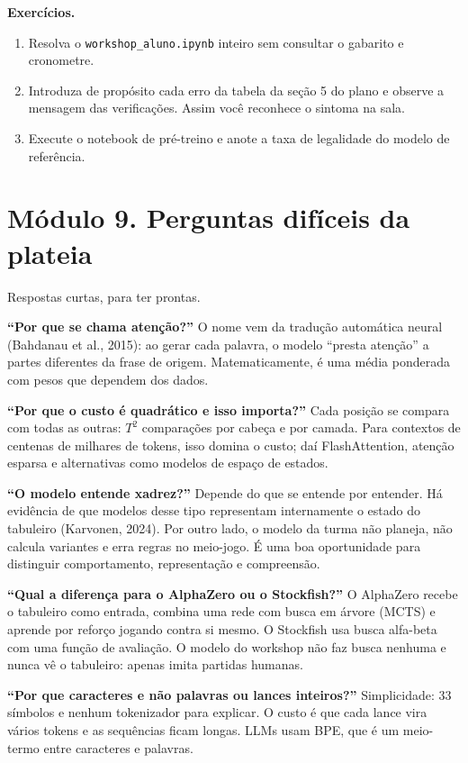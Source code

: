 \documentclass[
  11pt,
]{article}
\providecommand{\tightlist}{%
  \setlength{\itemsep}{0pt}\setlength{\parskip}{0pt}}
\begin{document}
\textbf{Exercícios.}

\begin{enumerate}
\def\labelenumi{\arabic{enumi}.}
\tightlist
\item
  Resolva o \texttt{workshop\_aluno.ipynb} inteiro sem consultar o
  gabarito e cronometre.
\item
  Introduza de propósito cada erro da tabela da seção 5 do plano e
  observe a mensagem das verificações. Assim você reconhece o sintoma na
  sala.
\item
  Execute o notebook de pré-treino e anote a taxa de legalidade do
  modelo de referência.
\end{enumerate}

\section{Módulo 9. Perguntas difíceis da
plateia}\label{muxf3dulo-9.-perguntas-difuxedceis-da-plateia}

Respostas curtas, para ter prontas.

\textbf{``Por que se chama atenção?''} O nome vem da tradução automática
neural (Bahdanau et al., 2015): ao gerar cada palavra, o modelo ``presta
atenção'' a partes diferentes da frase de origem. Matematicamente, é uma
média ponderada com pesos que dependem dos dados.

\textbf{``Por que o custo é quadrático e isso importa?''} Cada posição
se compara com todas as outras: \(T^2\) comparações por cabeça e por
camada. Para contextos de centenas de milhares de tokens, isso domina o
custo; daí FlashAttention, atenção esparsa e alternativas como modelos
de espaço de estados.

\textbf{``O modelo entende xadrez?''} Depende do que se entende por
entender. Há evidência de que modelos desse tipo representam
internamente o estado do tabuleiro (Karvonen, 2024). Por outro lado, o
modelo da turma não planeja, não calcula variantes e erra regras no
meio-jogo. É uma boa oportunidade para distinguir comportamento,
representação e compreensão.

\textbf{``Qual a diferença para o AlphaZero ou o Stockfish?''} O
AlphaZero recebe o tabuleiro como entrada, combina uma rede com busca em
árvore (MCTS) e aprende por reforço jogando contra si mesmo. O Stockfish
usa busca alfa-beta com uma função de avaliação. O modelo do workshop
não faz busca nenhuma e nunca vê o tabuleiro: apenas imita partidas
humanas.

\textbf{``Por que caracteres e não palavras ou lances inteiros?''}
Simplicidade: 33 símbolos e nenhum tokenizador para explicar. O custo é
que cada lance vira vários tokens e as sequências ficam longas. LLMs
usam BPE, que é um meio-termo entre caracteres e palavras.
\end{document}
